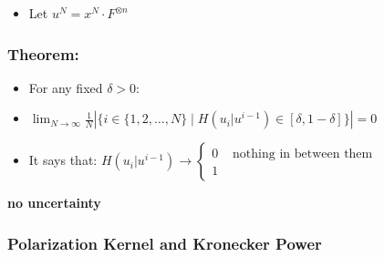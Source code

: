 \documentclass[11pt]{article}
\providecommand{\tightlist}{%
      \setlength{\itemsep}{0pt}\setlength{\parskip}{0pt}}
\begin{document}
\begin{itemize}
\tightlist
\item
  Let \(u^N = x^N \cdot F^{\otimes n}\)
\end{itemize}

\subsubsection{Theorem:}\label{theorem}

\begin{itemize}
\item
  For any fixed \(\delta > 0\):
\item
  \(\boxed{\lim_{N \to \infty} \frac{1}{N} \left| \{ i \in \{1, 2, \dots, N\} \mid H(u_i | u^{i-1}) \in [\delta, 1-\delta] \} \right| = 0}\)
\item
  It says that:
  \(H(u_i | u^{i-1}) \to \begin{cases} 0       & \boxed{\text{ nothing in between them}} \\ 1 \end{cases}\)
\end{itemize}

\textbf{no uncertainty}

    \subsubsection{Polarization Kernel and Kronecker
Power}\label{polarization-kernel-and-kronecker-power}
\end{document}
